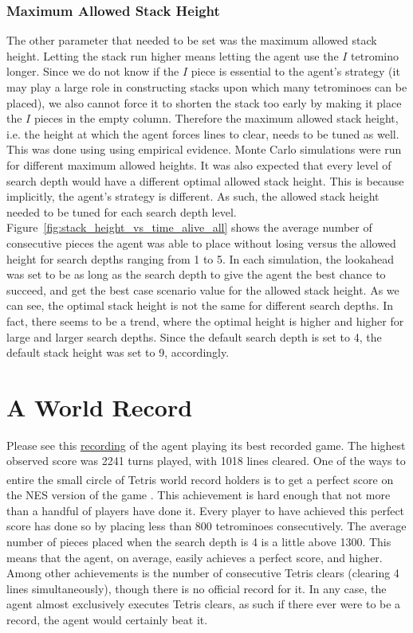 \documentclass[fontsize=12pt]{article}
\def\tetris{Tetris\textsuperscript{\textregistered}}
\begin{document}
\subsubsection{Maximum Allowed Stack Height}
\label{ssub:maximum_allowed_stack_height}
\par The other parameter that needed to be set was the maximum allowed stack height. Letting the stack run higher means letting the agent use the $I$ tetromino longer. Since we do not know if the $I$ piece is essential to the agent's strategy (it may play a large role in constructing stacks upon which many tetrominoes can be placed), we also cannot force it to shorten the stack too early by making it place the $I$ pieces in the empty column. Therefore the maximum allowed stack height, i.e. the height at which the agent forces lines to clear, needs to be tuned as well. This was done using using empirical evidence. Monte Carlo simulations were run for different maximum allowed heights. It was also expected that every level of search depth would have a different optimal allowed stack height. This is because implicitly, the agent's strategy is different. As such, the allowed stack height needed to be tuned for each search depth level. Figure~\ref{fig:stack_height_vs_time_alive_all} shows the average number of consecutive pieces the agent was able to place without losing versus the allowed height for search depths ranging from 1 to 5. In each simulation, the lookahead was set to be as long as the search depth to give the agent the best chance to succeed, and get the best case scenario value for the allowed stack height. As we can see, the optimal stack height is not the same for different search depths. In fact, there seems to be a trend, where the optimal height is higher and higher for large and larger search depths. Since the default search depth is set to 4, the default stack height was set to 9, accordingly.


\section{A World Record}
\label{sec:a_world_record}
\par Please see this \href{https://www.youtube.com/watch?v=YpMx1XobhWA}{\ttfamily\color{blue} \underline{recording}} of the agent playing its best recorded game. The highest observed score was 2241 turns played, with 1018 lines cleared. One of the ways to entire the small circle of \tetris{} world record holders is to get a perfect score on the NES version of the game \cite{bib:world_record}. This achievement is hard enough that not more than a handful of players have done it. Every player to have achieved this perfect score has done so by placing less than 800 tetrominoes consecutively. The average number of pieces placed when the search depth is 4 is a little above 1300. This means that the agent, on average, easily achieves a perfect score, and higher. Among other achievements is the number of consecutive Tetris clears (clearing 4 lines simultaneously), though there is no official record for it. In any case, the agent almost exclusively executes Tetris clears, as such if there ever were to be a record, the agent would certainly beat it.
\end{document}

